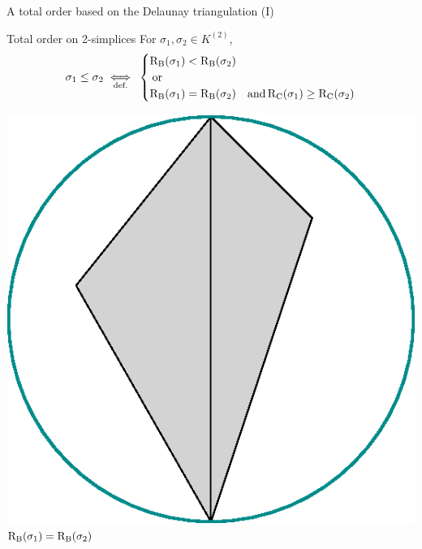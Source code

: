 \begin{frame}[c]{A total order based on the Delaunay triangulation (I)}
	\scriptsize
	\begin{block}{\scriptsize Total order on 2-simplices}
		For $\sigma_1, \sigma_2 \in K^{(2)}$,
		\[
		\sigma_1 \leq \sigma_2 \underset{\text{def.}}{\iff} \:
		\begin{cases}
			\operatorname{R_B}(\sigma_1) < \operatorname{R_B}(\sigma_2) &\\
			\:  \operatorname{or} &\\
			\operatorname{R_B}(\sigma_1) = \operatorname{R_B}(\sigma_2) & \operatorname{and} \operatorname{R_C}(\sigma_1) \geq \operatorname{R_C}(\sigma_2)
		\end{cases}
		\]
	\end{block}
	
	\begin{center}
		\begin{minipage}{0.5\linewidth}
			\centering
			\includegraphics[height=0.3\textheight]{order_rseb}\\
			\color{pathblue}$\operatorname{R_B}(\sigma_1) = \operatorname{R_B}(\sigma_2)$	
		\end{minipage}%
		\begin{minipage}{0.5\linewidth}
			\centering

\end{minipage}
\end{center}
\end{frame}
